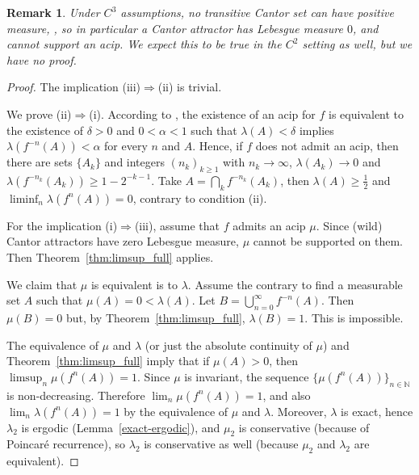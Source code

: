 \documentclass[12pt, psamsfonts, reqno]{amsart}
\newtheorem{remark}[theorem]{Remark}
\begin{document}
\begin{remark}
Under $C^3$ assumptions, no transitive Cantor set can have
positive measure, \cite[Theorem~E(1), cf. also Remark 1]{vSV}, so
in particular a Cantor attractor has Lebesgue measure $0$, and
cannot support an acip. We expect this to be true in the $C^2$
setting as well, but we have no proof.
\end{remark}

\begin{proof}
 The implication (iii)$\Rightarrow$(ii) is trivial.

 We prove (ii)$\Rightarrow$(i). According to \cite{Str}, the
 existence of an acip for $f$ is
 equivalent to the existence of $\delta>0$ and $0<\alpha<1$ such
 that $\lambda(A)<\delta$ implies $\lambda(f^{-n}(A))<\alpha$ for
 every $n$ and $A$.
Hence, if $f$ does not admit an acip, then there
 are sets $\{ A_k \}$ and integers $(n_k)_{k \geq 1}$ with $n_k \to \infty$,
 $\lambda(A_k)\to 0$ and $\lambda(f^{-n_k}(A_k))\geq 1-2^{-k-1}$.
Take $A = \bigcap_k f^{-n_k}(A_k)$, then $\lambda(A) \geq \frac12$
and $\liminf_n \lambda(f^n(A)) = 0$, contrary to condition (ii).

For the implication (i)$\Rightarrow$(iii), assume that $f$ admits
an acip $\mu$. Since (wild) Cantor attractors have zero Lebesgue
measure, $\mu$ cannot be supported on them. Then
Theorem~\ref{thm:limsup_full} applies.

 We claim that $\mu$ is equivalent is to $\lambda$. Assume the
 contrary to find a measurable set $A$ such that
 $\mu(A)=0<\lambda(A)$. Let $B= \bigcup_{n=0}^{\infty} f^{-n}(A)$.
 Then $\mu(B)=0$ but, by  Theorem~\ref{thm:limsup_full},
 $\lambda(B)=1$. This is impossible.

 The equivalence of $\mu$ and $\lambda$ (or just the absolute
 continuity of $\mu$)  and  Theorem~\ref{thm:limsup_full}
 imply that if $\mu(A)>0$, then $\limsup_n \mu(f^n(A))=1$. Since
 $\mu$ is invariant, the sequence $\{\mu(f^n(A))\}_{n \in {{\mathbb N}}}$ is
 non-decreasing. Therefore $\lim_n \mu(f^n(A))=1$, and
 also $\lim_n \lambda(f^n(A))=1$ by the equivalence of $\mu$
 and $\lambda$. Moreover, $\lambda$ is exact, hence $\lambda_2$ is ergodic
 (Lemma~\ref{exact-ergodic}), and $\mu_2$ is conservative (because
 of Poincar\'e recurrence), so $\lambda_2$ is conservative as well
 (because $\mu_2$ and $\lambda_2$ are equivalent).
\end{proof}

\iffalse
\begin{remark}
A question in this context is: Are there topologically mixing interval maps
without Cantor attractors such that almost no pair $(x,y)$ has a
dense orbit in $I^2$?
\end{remark}
\fi
\end{document}
